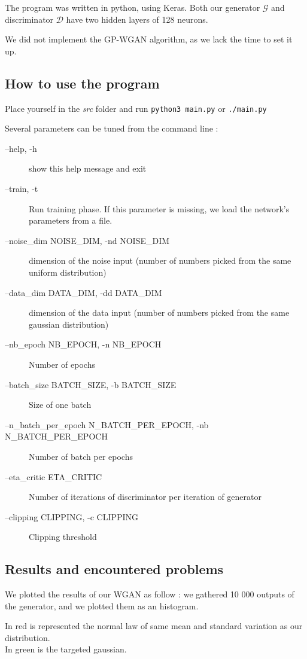 \documentclass[a4paper]{article}
\newcommand{\G}{\mathcal{G}}
\newcommand{\D}{\mathcal{D}}
\theoremstyle{plain}
\theoremstyle{remark}
\theoremstyle{definition}
\begin{document}
The program was written in python, using Keras. Both our generator $\G$ and discriminator $\D$ have two hidden layers of 128 neurons.

We did not implement the GP-WGAN algorithm, as we lack the time to set it up.

\subsection{How to use the program}

Place yourself in the \emph{src} folder and run \texttt{python3 main.py} or \texttt{./main.py}

Several parameters can be tuned from the command line :
\begin{description}
\item[--help, -h] show this help message and exit
\item[--train, -t] Run training phase. If this parameter is missing, we load the network's parameters from a file.
\item[--noise\_dim NOISE\_DIM, -nd NOISE\_DIM] dimension of the noise input (number of numbers picked from the same uniform distribution)
\item[--data\_dim DATA\_DIM, -dd DATA\_DIM] dimension of the data input (number of numbers picked from the same gaussian distribution)
\item[--nb\_epoch NB\_EPOCH, -n NB\_EPOCH] Number of epochs
\item[--batch\_size BATCH\_SIZE, -b BATCH\_SIZE] Size of one batch
\item[--n\_batch\_per\_epoch N\_BATCH\_PER\_EPOCH, -nb N\_BATCH\_PER\_EPOCH] Number of batch per epochs
\item[--eta\_critic ETA\_CRITIC] Number of iterations of discriminator per iteration of generator
\item[--clipping CLIPPING, -c CLIPPING] Clipping threshold
\end{description}

\subsection{Results and encountered problems}

We plotted the results of our WGAN as follow : we gathered 10 000 outputs of the generator, and we plotted them as an histogram.

In red is represented the normal law of same mean and standard variation as our distribution. \\
In green is the targeted gaussian.
\end{document}
